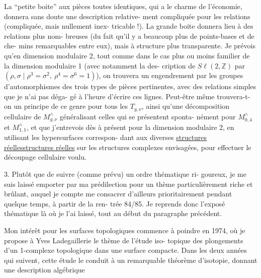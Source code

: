 \documentclass[11pt,a4paper]{article}
\let\TextUline\uline
\renewcommand{\uline}[1]{\ifmmode\underline{#1}\else\TextUline{#1}\fi}
\begin{document}
La ``petite boite'' aux pièces toutes identiques, qui a le
charme de l'économie, donnera sans doute une description relative-%
ment compliquée pour les relations (compliquée, mais nullement inex-%
tricable !). La grande boite donnera lieu à des relations plus nom-%
breuses (du fait qu'il y a beaucoup plus de points-bases et de che-%
mins remarquables entre eux), mais à structure plus transparente. Je
prévois qu'en dimension modulaire 2, tout comme dans le cas plus ou
moins familier de la dimension modulaire 1 (avec notamment la des-%
cription de $S\ell(2,\mathbb{Z})$ par $(\rho,\sigma \mid \rho^3 = \sigma^2,\ \rho^4 = \sigma^6 = 1)$), on trouvera
un engendrement par les groupes d'automorphismes des trois types de
pièces pertinentes, avec des relations simples que je n'ai pas déga-%
gé à l'heure d'écrire ces lignes. Peut-être même trouvera-t-on un
principe de ce genre pour tous les $T_{g,\nu}$, ainsi qu'une décomposition
cellulaire de $M^{\wedge}_{g,\nu}$ généralisant celles qui se présentent sponta-%
nément pour $M^{\wedge}_{0,4}$ et $M^{\wedge}_{1,1}$, et que j'entrevois dès à présent pour
la dimension modulaire 2, en utilisant les hypersurfaces correspon-%
dant aux diverses \uline{structures réelles} sur les structures complexes
envisagées, pour effectuer le découpage cellulaire voulu.


3. Plutôt que de suivre (comme prévu) un ordre thématique ri-%
goureux, je me suis laissé emporter par ma prédilection pour un thème
particulièrement riche et brûlant, auquel je compte me consacrer
d'ailleurs prioritairement pendant quelque temps, à partir de la ren-%
trée 84/85. Je reprends donc l'exposé thématique là où je l'ai laissé,
tout au début du paragraphe précédent.

Mon intérêt pour les surfaces topologiques commence à poindre
en 1974, où je propose à Yves Ladegaillerie le thème de l'étude iso-%
topique des plongements d'un 1-complexe topologique dans une surface
compacte. Dans les deux années qui suivent, cette étude le conduit à
un remarquable théorème d'isotopie, donnant une description algébrique
\end{document}
